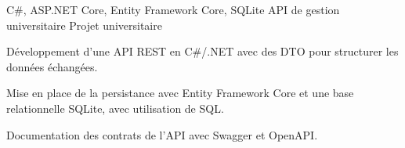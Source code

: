 
\begin{cventries}
  \cventry
    {C\#, ASP.NET Core, Entity Framework Core, SQLite}
    {API de gestion universitaire}
    {Projet universitaire}
    {}
    {
      \begin{cvitems}
        \item {Développement d’une API REST en C\#/.NET avec des DTO pour structurer les données échangées.}
        \item {Mise en place de la persistance avec Entity Framework Core et une base relationnelle SQLite, avec utilisation de SQL.}
        \item {Documentation des contrats de l’API avec Swagger et OpenAPI.}
      \end{cvitems}
    }
\end{cventries}
